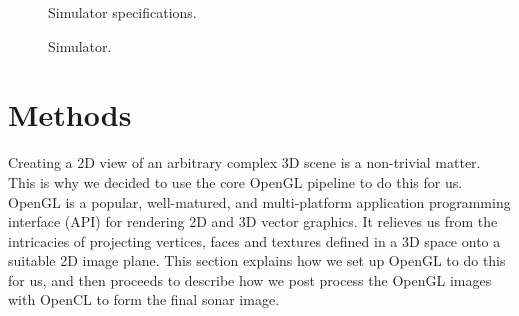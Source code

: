\documentclass[
   UAM                                          %
 , 12pt                                         %
 , bibtex                                       %
 , layout
]{common/mytemplate}
\begin{document}
% 


\begin{figure}[t]\centering%
%
\caption{Simulator specifications.}\label{specs}%
\end{figure}

\begin{figure}[t]\centering%
%
\caption{Simulator.}\label{buildup}%
\end{figure}

\section{Methods}

Creating a 2D view of an arbitrary complex 3D scene is a non-trivial matter. This is why we decided to use the core OpenGL pipeline to do this for us. OpenGL is a popular, well-matured, and multi-platform application programming interface (API) for rendering 2D and 3D vector graphics. It relieves us from the intricacies of projecting vertices, faces and textures defined in a 3D space onto a suitable 2D image plane. This section explains how we set up OpenGL to do this for us, and then proceeds to describe how we post process the OpenGL images with OpenCL to form the final sonar image.
\end{document}
